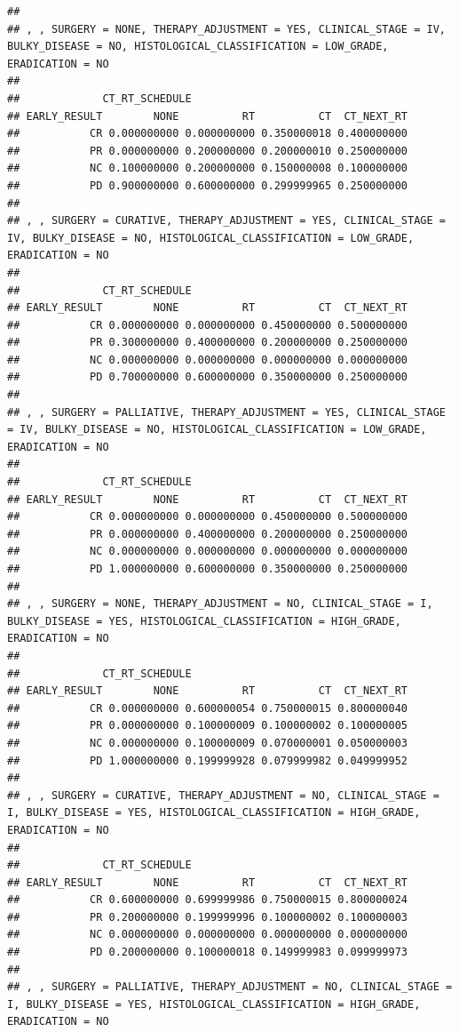 \documentclass[]{article}
\begin{document}
\begin{verbatim}
## 
## , , SURGERY = NONE, THERAPY_ADJUSTMENT = YES, CLINICAL_STAGE = IV, BULKY_DISEASE = NO, HISTOLOGICAL_CLASSIFICATION = LOW_GRADE, ERADICATION = NO
## 
##             CT_RT_SCHEDULE
## EARLY_RESULT        NONE          RT          CT  CT_NEXT_RT
##           CR 0.000000000 0.000000000 0.350000018 0.400000000
##           PR 0.000000000 0.200000000 0.200000010 0.250000000
##           NC 0.100000000 0.200000000 0.150000008 0.100000000
##           PD 0.900000000 0.600000000 0.299999965 0.250000000
## 
## , , SURGERY = CURATIVE, THERAPY_ADJUSTMENT = YES, CLINICAL_STAGE = IV, BULKY_DISEASE = NO, HISTOLOGICAL_CLASSIFICATION = LOW_GRADE, ERADICATION = NO
## 
##             CT_RT_SCHEDULE
## EARLY_RESULT        NONE          RT          CT  CT_NEXT_RT
##           CR 0.000000000 0.000000000 0.450000000 0.500000000
##           PR 0.300000000 0.400000000 0.200000000 0.250000000
##           NC 0.000000000 0.000000000 0.000000000 0.000000000
##           PD 0.700000000 0.600000000 0.350000000 0.250000000
## 
## , , SURGERY = PALLIATIVE, THERAPY_ADJUSTMENT = YES, CLINICAL_STAGE = IV, BULKY_DISEASE = NO, HISTOLOGICAL_CLASSIFICATION = LOW_GRADE, ERADICATION = NO
## 
##             CT_RT_SCHEDULE
## EARLY_RESULT        NONE          RT          CT  CT_NEXT_RT
##           CR 0.000000000 0.000000000 0.450000000 0.500000000
##           PR 0.000000000 0.400000000 0.200000000 0.250000000
##           NC 0.000000000 0.000000000 0.000000000 0.000000000
##           PD 1.000000000 0.600000000 0.350000000 0.250000000
## 
## , , SURGERY = NONE, THERAPY_ADJUSTMENT = NO, CLINICAL_STAGE = I, BULKY_DISEASE = YES, HISTOLOGICAL_CLASSIFICATION = HIGH_GRADE, ERADICATION = NO
## 
##             CT_RT_SCHEDULE
## EARLY_RESULT        NONE          RT          CT  CT_NEXT_RT
##           CR 0.000000000 0.600000054 0.750000015 0.800000040
##           PR 0.000000000 0.100000009 0.100000002 0.100000005
##           NC 0.000000000 0.100000009 0.070000001 0.050000003
##           PD 1.000000000 0.199999928 0.079999982 0.049999952
## 
## , , SURGERY = CURATIVE, THERAPY_ADJUSTMENT = NO, CLINICAL_STAGE = I, BULKY_DISEASE = YES, HISTOLOGICAL_CLASSIFICATION = HIGH_GRADE, ERADICATION = NO
## 
##             CT_RT_SCHEDULE
## EARLY_RESULT        NONE          RT          CT  CT_NEXT_RT
##           CR 0.600000000 0.699999986 0.750000015 0.800000024
##           PR 0.200000000 0.199999996 0.100000002 0.100000003
##           NC 0.000000000 0.000000000 0.000000000 0.000000000
##           PD 0.200000000 0.100000018 0.149999983 0.099999973
## 
## , , SURGERY = PALLIATIVE, THERAPY_ADJUSTMENT = NO, CLINICAL_STAGE = I, BULKY_DISEASE = YES, HISTOLOGICAL_CLASSIFICATION = HIGH_GRADE, ERADICATION = NO

\end{verbatim}
\end{document}
